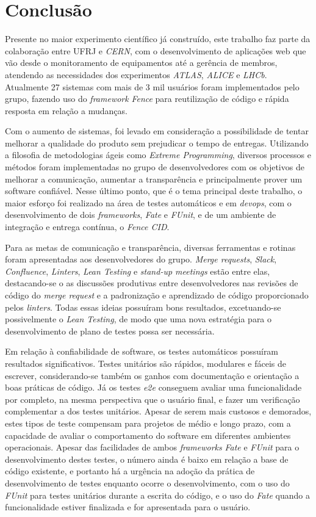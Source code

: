 \chapter{Conclusão}\label{cap_conclusao}

Presente no maior experimento científico já construído, este trabalho faz parte da colaboração entre UFRJ e \emph{CERN}, com o desenvolvimento de aplicações web que vão desde o monitoramento de equipamentos até a gerência de membros, atendendo as necessidades dos experimentos \emph{ATLAS}, \emph{ALICE} e \emph{LHCb}. Atualmente 27 sistemas com mais de 3 mil usuários foram implementados pelo grupo, fazendo uso do \emph{framework} \emph{Fence} para reutilização de código e rápida resposta em relação a mudanças.

Com o aumento de sistemas, foi levado em consideração a possibilidade de tentar melhorar a qualidade do produto sem prejudicar o tempo de entregas. Utilizando a filosofia de metodologias ágeis como \emph{Extreme Programming}, diversos processos e métodos foram implementadas no grupo de desenvolvedores com os objetivos de melhorar a comunicação, aumentar a transparência e principalmente prover um software confiável. Nesse último ponto, que é o tema principal deste trabalho, o maior esforço foi realizado na área de testes automáticos e em \emph{devops}, com o desenvolvimento de dois \emph{frameworks}, \emph{Fate} e \emph{FUnit}, e de um ambiente de integração e entrega contínua, o \emph{Fence CID}.

Para as metas de comunicação e transparência, diversas ferramentas e rotinas foram apresentadas aos desenvolvedores do grupo. \emph{Merge requests}, \emph{Slack}, \emph{Confluence}, \emph{Linters}, \emph{Lean Testing} e \emph{stand-up meetings} estão entre elas, destacando-se o as discussões produtivas entre desenvolvedores nas revisões de código do \emph{merge request} e a padronização e aprendizado de código proporcionado pelos \emph{linters}. Todas essas ideias possuíram bons resultados, excetuando-se possivelmente o \emph{Lean Testing}, de modo que uma nova estratégia para o desenvolvimento de plano de testes possa ser necessária.

Em relação à confiabilidade de software, os testes automáticos possuíram resultados significativos. Testes unitários são rápidos, modulares e fáceis de escrever, considerando-se também os ganhos com documentação e orientação a boas práticas de código. Já os testes \emph{e2e} conseguem avaliar uma funcionalidade por completo, na mesma perspectiva que o usuário final, e fazer um verificação complementar a dos testes unitários. Apesar de serem mais custosos e demorados, estes tipos de teste compensam para projetos de médio e longo prazo, com a capacidade de avaliar o comportamento do software em diferentes ambientes operacionais. Apesar das facilidades de ambos \emph{frameworks} \emph{Fate} e \emph{FUnit} para o desenvolvimento destes testes, o número ainda é baixo em relação a base de código existente, e portanto há a urgência na adoção da prática de desenvolvimento de testes enquanto ocorre o desenvolvimento, com o uso do \emph{FUnit} para testes unitários durante a escrita do código, e o uso do \emph{Fate} quando a funcionalidade estiver finalizada e for apresentada para o usuário.

